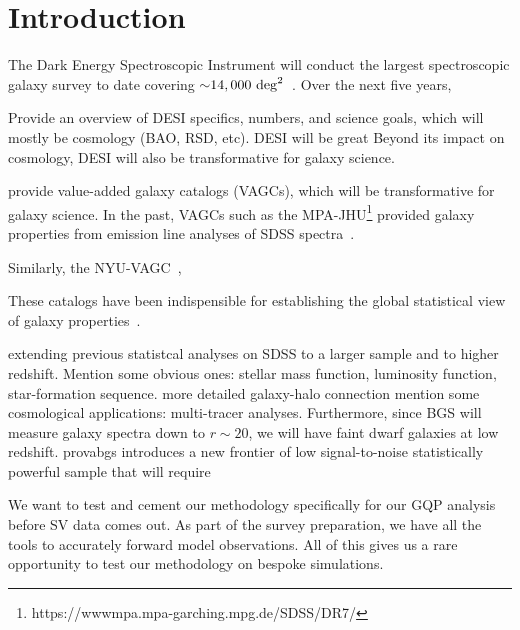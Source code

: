 \section{Introduction} \label{sec:intro} 

The Dark Energy Spectroscopic Instrument will conduct the largest spectroscopic
galaxy survey to date covering ${\sim}14,000~{\rm deg}^2$~\citep{desicollaboration2016}. 
Over the next five years, 

Provide an overview of DESI specifics, numbers, and science goals, which will 
mostly be cosmology (BAO, RSD, etc). DESI will be great
Beyond its impact on cosmology, DESI will also be transformative for galaxy
science. 

provide value-added galaxy
catalogs (VAGCs), which will be transformative for galaxy science. 
In the past, VAGCs such as the
MPA-JHU\footnote{https://wwwmpa.mpa-garching.mpg.de/SDSS/DR7/}
provided galaxy properties from emission line analyses of SDSS
spectra~\cite{brinchmann2004}. 

Similarly, the NYU-VAGC~\citep{blanton2005}, 

These catalogs have been indispensible for establishing the global statistical
view of galaxy properties~\citep[see][for a review]{blanton2009}. 


extending previous statistcal analyses on SDSS to a larger sample and to higher
redshift. 
Mention some obvious ones: stellar mass function, luminosity function,
star-formation sequence.  
more detailed galaxy-halo connection 
mention some cosmological applications: multi-tracer analyses.  
Furthermore, since BGS will measure galaxy spectra down to $r\sim20$, we will
have faint dwarf galaxies at low redshift. 
provabgs introduces a new frontier of low signal-to-noise statistically
powerful sample that will require  

We want to test and cement our methodology specifically for our GQP 
analysis before SV data comes out. 
As part of the survey preparation, we have all the tools to accurately 
forward model observations. 
All of this gives us a rare opportunity to test our methodology on bespoke
simulations. 

